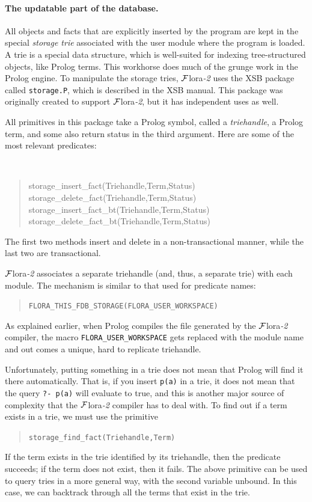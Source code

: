 \documentclass[11pt]{article}
\newcommand{\FLSYSTEM}{{\mbox{\sc ${\cal F}${lora}\rm\emph{-2}}}\xspace}
\begin{document}
\paragraph{The updatable part of the database.}
All objects and facts that are explicitly inserted by the program are kept
in the special \emph{storage trie} associated with the user module where the
program is loaded. A trie is a special data structure, which is
well-suited for indexing tree-structured objects, like Prolog terms. This
workhorse does much of the grunge work in the Prolog engine. To manipulate the
storage tries, \FLSYSTEM uses the XSB package called {\tt storage.P}, which is
described in the XSB manual. This package was originally created to support
\FLSYSTEM, but it has independent uses as well.

All primitives in this package take a Prolog symbol, called a
\emph{triehandle}, a Prolog term, and some also return status in the third
argument. Here are some of the most relevant predicates:
{\tt
\begin{quote}
  storage\_insert\_fact(Triehandle,Term,Status)\\
  storage\_delete\_fact(Triehandle,Term,Status)\\
  storage\_insert\_fact\_bt(Triehandle,Term,Status)\\
  storage\_delete\_fact\_bt(Triehandle,Term,Status)
\end{quote}
}
\noindent
The first two methods insert and delete in a non-transactional manner,
while the last two are transactional.

\FLSYSTEM associates a separate triehandle (and, thus, a separate trie) with
each module. The mechanism is similar to that used for predicate names:
\begin{quote}
 \tt FLORA\_THIS\_FDB\_STORAGE(FLORA\_USER\_WORKSPACE)  
\end{quote}
As explained earlier, when Prolog compiles the file generated by the
\FLSYSTEM compiler, the macro {\tt FLORA\_USER\_WORKSPACE} gets replaced with
the module name and out comes a unique, hard to replicate triehandle.

Unfortunately, putting something in a trie does not mean that Prolog will find
it there automatically. That is, if you insert {\tt p(a)} in a trie, it
does not mean that the query {\tt ?- p(a)} will evaluate to true, and this
is another major source of complexity that the \FLSYSTEM compiler has to deal
with. To find out if a term exists in a trie, we must use the primitive
\begin{quote}
 \tt storage\_find\_fact(Triehandle,Term)  
\end{quote}
If the term exists in the trie identified by its triehandle, then the
predicate succeeds; if the term does not exist, then it fails. The above
primitive can be used to query tries in a more general way, with the second
variable unbound. In this case, we can backtrack through all the terms that
exist in the trie.
\end{document}
